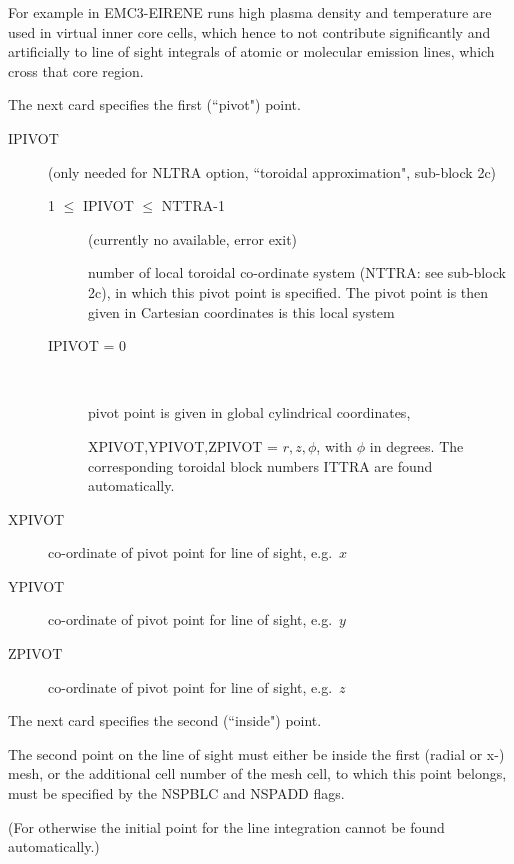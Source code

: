 For example in EMC3-EIRENE runs high plasma density and temperature are used in
virtual inner core cells, which hence to not contribute significantly and
artificially to line of sight integrals of atomic or molecular emission lines,
which cross that core region.

\medskip

The next card specifies the first (``pivot") point.

\begin{description}
  \item[IPIVOT] (only needed for NLTRA option, ``toroidal approximation",
        sub-block 2c)
        \begin{description}
          \item[1 $\leq$ IPIVOT $\leq$ NTTRA-1]
                (currently no available, error exit) 

                number of local toroidal co-ordinate system (NTTRA: see sub-block 2c), in which
                this pivot point is specified.
                The pivot point is then given in Cartesian coordinates is this local system
          \item[IPIVOT = 0] ~ 

                pivot point is given in global cylindrical coordinates, 

                XPIVOT,YPIVOT,ZPIVOT = $r,z,\phi$, with $\phi$ in degrees.
                The corresponding toroidal block numbers ITTRA are found automatically.
        \end{description}
  \item[XPIVOT]  co-ordinate of pivot point for line of sight,
        e.g.\ $x$
  \item[YPIVOT]  co-ordinate of pivot point for line of
        sight, e.g.\ $y$
  \item[ZPIVOT]  co-ordinate of pivot point for
        line of sight, e.g.\ $z$
\end{description}
The next card specifies the second
(``inside") point.

The second point on the line of sight must either be inside the first (radial
or x-) mesh, or the additional cell number of the mesh cell, to which this
point belongs, must be specified by the NSPBLC and NSPADD flags.

(For otherwise the initial point for the line integration cannot be found
automatically.)

